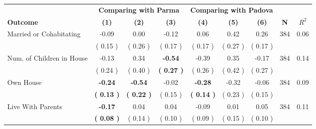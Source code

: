 \begin{tabular}{lcccccccc}
\toprule
 & \multicolumn{3}{c}{\textbf{Comparing with Parma}} & \multicolumn{3}{c}{\textbf{Comparing with Padova}} & \\
\cmidrule(lr){2-4} \cmidrule(lr){5-7} 
 \textbf{Outcome} & \textbf{(1)} & \textbf{(2)} & \textbf{(3)} & \textbf{(4)} & \textbf{(5)} & \textbf{(6)} & \textbf{N} & \textbf{$ R^2$} \\
\midrule
Married or Cohabitating &     -0.09 &      0.00 &     -0.12 &      0.06 &      0.42 &      0.26 & 384 &       0.06 \\ 
 & (     0.15 ) & (     0.26 ) & (     0.17 ) & (     0.17 ) & (     0.27 ) & (     0.17 ) & \\
Num. of Children in House &     -0.13 &      0.34 & \textbf{    -0.54} &     -0.39 &      0.35 &     -0.17 & 384 &       0.14 \\ 
 & (     0.24 ) & (     0.40 ) & \textbf{(     0.27 )} & (     0.26 ) & (     0.42 ) & (     0.27 ) & \\
Own House & \textbf{    -0.24} & \textbf{    -0.54} &     -0.02 & \textbf{    -0.28} &     -0.32 &     -0.06 & 384 &       0.09 \\ 
 & \textbf{(     0.13 )} & \textbf{(     0.22 )} & (     0.15 ) & \textbf{(     0.14 )} & (     0.23 ) & (     0.15 ) & \\
Live With Parents & \textbf{    -0.17} &      0.04 &      0.04 &     -0.09 &      0.01 &      0.05 & 384 &       0.11 \\ 
 & \textbf{(     0.08 )} & (     0.14 ) & (     0.10 ) & (     0.09 ) & (     0.15 ) & (     0.10 ) & \\
\bottomrule
\end{tabular}
